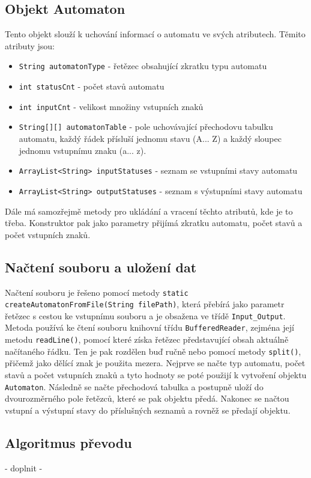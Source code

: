\documentclass[11pt]{article}
\begin{document}
\subsection{Objekt Automaton}
Tento objekt slouží k uchování informací o automatu ve svých atributech. Těmito atributy jsou:

\begin{itemize}
\item \texttt{String automatonType} - řetězec obsahující zkratku typu automatu
\item \texttt{int statusCnt} - počet stavů automatu 
\item \texttt{int inputCnt} - velikost množiny vstupních znaků
\item \texttt{String[][] automatonTable} - pole uchovávající přechodovu tabulku automatu, každý řádek přísluší jednomu stavu (A... Z) a každý sloupec jednomu vstupnímu znaku (a... z).
\item \texttt{ArrayList<String> inputStatuses} - seznam se vstupními stavy automatu
\item \texttt{ArrayList<String> outputStatuses} - seznam s výstupními stavy automatu
\end{itemize}

Dále má samozřejmě metody pro ukládání a vracení těchto atributů, kde je to třeba. Konstruktor pak jako parametry přijímá zkratku automatu, počet stavů a počet vstupních znaků.

\subsection{Načtení souboru a uložení dat}
Načtení souboru je řešeno pomocí metody \texttt{static createAutomatonFromFile(String filePath)}, která přebírá jako parametr řetězec s cestou ke vstupnímu souboru a je obsažena ve třídě \texttt{Input\_Output}. Metoda používá ke čtení souboru knihovní třídu \texttt{BufferedReader}, zejména její metodu \texttt{readLine()}, pomocí které získa řetězec představující obsah aktuálně načítaného řádku. Ten je pak rozdělen buď ručně nebo pomocí metody \texttt{split()}, přičemž jako dělící znak je použita mezera. Nejprve se načte typ automatu, počet stavů a počet vstupních znaků a tyto hodnoty se poté použijí k vytvoření objektu \texttt{Automaton}. Následně se načte přechodová tabulka a postupně uloží do dvourozměrného pole řetězců, které se pak objektu předá. Nakonec se načtou vstupní a výstupní stavy do příslušných seznamů a rovněž se předají objektu.

\subsection{Algoritmus převodu}
- doplnit -
\end{document}
